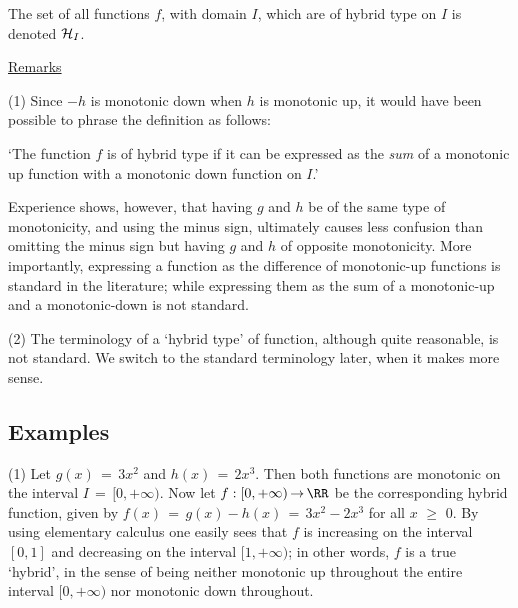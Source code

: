         The set of all functions $f$, with domain $I$, which are of hybrid type on $I$ is denoted ${\cal H}_{I}$.


\V

        \underline{Remarks}

\V

        (1) Since $-h$ is monotonic down when $h$ is monotonic up, it would have been possible to phrase the definition as follows:

        `The function $f$ is of hybrid type if it can be expressed as the {\em sum} of a monotonic up function with a monotonic down function on $I$.'

\noindent Experience shows, however, that having $g$ and $h$ be of the same type of monotonicity,
    and using the minus sign, ultimately causes less confusion than omitting the minus sign but having $g$ and $h$ of opposite monotonicity.
    More importantly, expressing a function as the difference of monotonic-up functions is standard in the literature;
    while expressing them as the sum of a monotonic-up and a monotonic-down is not standard.

\V

        (2) The terminology of a `hybrid type' of function, although quite reasonable, is not standard.
    We switch to the standard terminology later, when it makes more sense.


\V
\V

             \subsection{\small{\bf Examples}}
            \label{ExampF40.90}

\V

\hspace*{\parindent}(1) Let $g(x) \,=\, 3x^{2}$ and $h(x) \,=\, 2x^{3}$.
    Then both functions are monotonic on the interval $I \,=\, [0,+{\infty})$.
    Now let $f:[0,+{\infty}) \,{\rightarrow}\, {\RR}$ be the corresponding hybrid function,
    given by $f(x) \,=\, g(x)-h(x) \,=\, 3x^{2}-2x^{3}$ for all $x\,\,{\geq}\,\,0$.
    By using elementary calculus one easily sees that $f$ is increasing on the interval $[0,1]$ and decreasing on the interval $[1,+{\infty})$; in other words, $f$ is a true `hybrid', in the sense of being neither monotonic up throughout the entire interval $[0,+{\infty})$ nor monotonic down throughout.

\V

